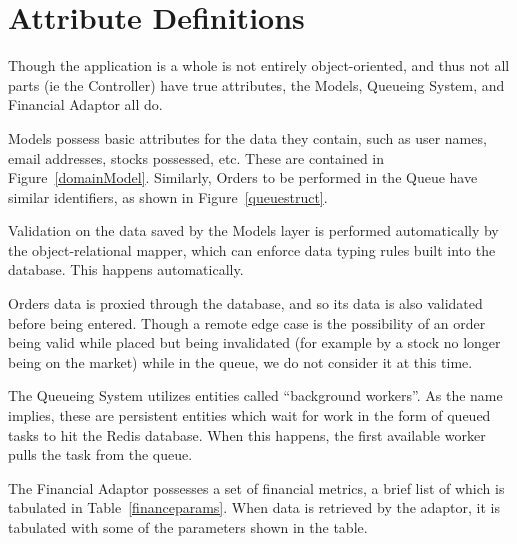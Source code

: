 \section{Attribute Definitions}

Though the application is a whole is not entirely object-oriented,
and thus not all parts (ie the Controller) have true attributes,
the Models, Queueing System, and Financial Adaptor all do. 

Models possess basic attributes for the data they contain, such
as user names, email addresses, stocks possessed, etc. These are
contained in Figure~\ref{domainModel}.  Similarly, Orders to
be performed in the Queue have similar identifiers, as shown in 
Figure~\ref{queuestruct}.

Validation on the data saved by the Models layer is performed 
automatically by the object-relational mapper, which can enforce
data typing rules built into the database. This happens automatically.

Orders data is proxied through the database, and so its data is also
validated before being entered. Though a remote edge case is the 
possibility of an order being valid while placed but being invalidated
(for example by a stock no longer being on the market) while in the
queue, we do not consider it at this time.

The Queueing System utilizes entities called ``background workers''.
As the name implies, these are persistent entities which wait
for work in the form of queued tasks to hit the Redis database. When
this happens, the first available worker pulls the task from the queue.

The Financial Adaptor possesses a set of financial metrics, a brief
list of which is tabulated in Table~\ref{financeparams}. When
data is retrieved by the adaptor, it is tabulated with some of the
parameters shown in the table. 


